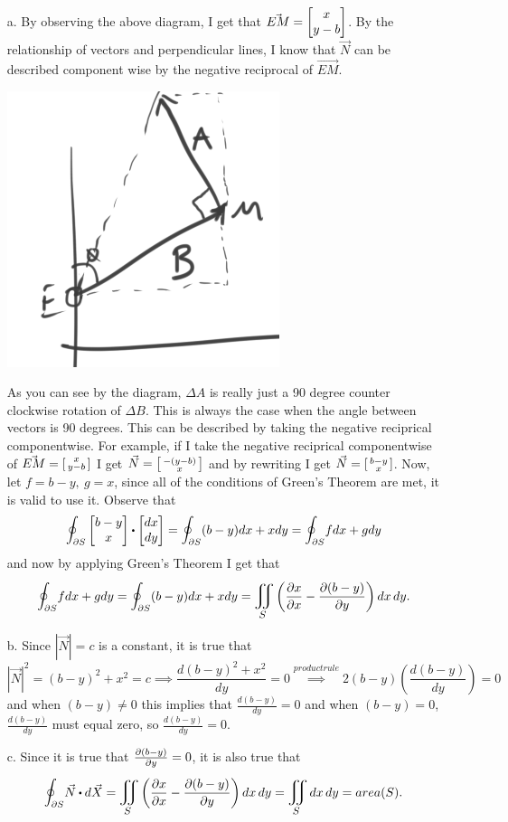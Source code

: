 \documentclass[titlepage]{article}
\begin{document}
\begin{solution}
\begin{itemize}
\vspace{-2em}
\item[a.] By observing the above diagram, I get that $\vec{EM} = \bmat{x \\ y-b}$. By the relationship of vectors and perpendicular lines, I know that $\vec{N}$ can be described component wise by the negative reciprocal of $\vec{EM}$.
\begin{center}\includegraphics[scale=.6]{perpenslope}\end{center}
As you can see by the diagram, $\Delta A$ is really just a 90 degree  counter clockwise rotation of $\Delta B$. This is always the case when the angle between vectors is 90 degrees. This can be described by taking the negative reciprical componentwise. For example, if I take the negative reciprical componentwise of $\vec{EM} = \left[\begin{smallmatrix}x \\ y-b\end{smallmatrix}\right]$ I get $\vec{N} = \left[\begin{smallmatrix}-(y-b) \\ x\end{smallmatrix}\right]$ and by rewriting I get $\vec{N} = \left[\begin{smallmatrix}b-y \\ x\end{smallmatrix}\right]$. Now, let $f = b-y,  \ g = x$, since all of the conditions of Green's Theorem are met, it is valid to use it. Observe that
$$\mathlarger\oint_{\p S} \bmat{b-y \\ x} \bigcdot \bmat{dx \\ dy} = \mathlarger\oint_{\p S} (b-y)dx + xdy = \mathlarger\oint_{\p S} fdx + gdy$$
and now by applying Green's Theorem I get that
$$ \mathlarger\oint_{\p S} fdx + gdy = \mathlarger\oint_{\p S} (b-y)dx + xdy =    \bigiint{S}{}\left( \frac{\p x}{\p x} - \frac{\p (b-y)}{\p y} \right)dx\,dy.$$
\item[b.] Since $|\vec{N}| = c$ is a constant, it is true that
$$|\vec{N}|^2 = (b-y)^2 + x^2 = c \implies \frac{d (b-y)^2 + x^2}{dy} = 0 \overset{product rule}{\implies} 2(b-y)\left(\frac{d (b-y)}{d y}\right) = 0$$
and when $(b-y) \neq 0$ this implies that $\frac{d (b-y)}{d y} = 0$ and when $(b-y) = 0$, $\frac{d (b-y)}{d y}$ must equal zero, so $\frac{d (b-y)}{d y} = 0$.
\item[c.] Since it is true that $\frac{\partial(b-y)}{\partial y} = 0$, it is also true that
$$ \mathlarger\oint_{\p S} \vec{N} \bigcdot d\vec{X} = \bigiint{S}{}\left( \frac{\p x}{\p x} - \frac{\p (b-y)}{\p y} \right)dx\,dy = \bigiint{S}{}\,dx\,dy = area(S).$$
\end{itemize}
\end{solution}
\end{document}
